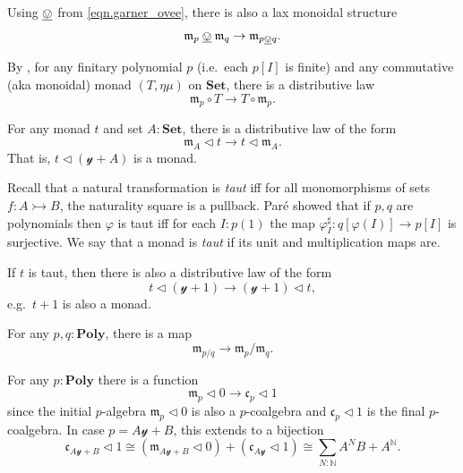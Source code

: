 \documentclass[11pt, one side, article]{memoir}
\theoremstyle{definition}
\theoremstyle{plain}
\newcommand{\Cat}[1]{\mathbf{#1}}%
\newcommand{\inj}{\rightarrowtail}
\newcommand{\ul}[1]{\underline{#1}}
\newcommand{\nn}{\mathbb{N}}
\newcommand{\smset}{\Cat{Set}}
\newcommand{\yon}{{\mathcal{y}}}
\newcommand{\poly}{\Cat{Poly}}
\newcommand{\0}{\textsf{0}}
\newcommand{\1}{\tn{\textsf{1}}}
\newcommand{\tri}{\mathbin{\triangleleft}}
\newcommand{\at}[2]{#1/#2}
\newcommand{\cofree}{\mathfrak{c}}
\newcommand{\free}{\mathfrak{m}}
\newcommand{\garner}[1]{\mathbin{\ul{#1}}}
\begin{document}

Using $\garner{\ovee}$ from \cref{eqn.garner_ovee}, there is also a lax monoidal structure
\begin{equation}
	\free_p\garner{\ovee}\free_q\to\free_{p\garner{\ovee}q}.
\end{equation}

By \cite[Thm.\ 4.2.20]{manes2007monad}, for any finitary polynomial $p$ (i.e.\ each $p[I]$ is finite) and any commutative (aka monoidal) monad $(T,\eta\mu)$ on $\smset$, there is a distributive law
\begin{equation}
\free_p\circ T
\to
T\circ \free_p.
\end{equation}

For any monad $t$ and set $A:\smset$, there is a distributive law of the form
\begin{equation}
	\free_A\tri t\to t\tri\free_A.
\end{equation}
That is, $t\tri(\yon+A)$ is a monad.

Recall that a natural transformation is \emph{taut} iff for all monomorphisms of sets $f\colon A\inj B$, the naturality square is a pullback. Par\'{e} showed that if $p,q$ are polynomials then $\varphi$ is taut iff for each $I:p(1)$ the map $\varphi_I^\sharp\colon q[\varphi(I)]\to p[I]$ is surjective. We say that a monad is \emph{taut} if its unit and multiplication maps are.

If $t$ is taut, then there is also a distributive law of the form
\begin{equation}\label{eqn.taut_distributive}
	t\tri(\yon+1)\to (\yon+1)\tri t,
\end{equation}
e.g.\ $t+1$ is also a monad. 

For any $p,q:\poly$, there is a map 
\begin{equation}
\free_{\at{p}{q}}\to\at{\free_p}{\free_q}. 
\end{equation}

For any $p:\poly$ there is a function
\begin{equation}
	\free_p\tri 0\to\cofree_p\tri 1
\end{equation}
since the initial $p$-algebra $\free_p\tri 0$ is also a $p$-coalgebra and $\cofree_p\tri 1$ is the final $p$-coalgebra. In case $p=A\yon+B$, this extends to a bijection 
\begin{equation}
	\cofree_{A\yon+B}\tri 1
	\cong
	\left(\free_{A\yon+B}\tri 0\right) +\left(\cofree_{A\yon}\tri 1\right)
	\cong\sum_{N:\nn}A^NB+A^\nn.
\end{equation}
\end{document}
